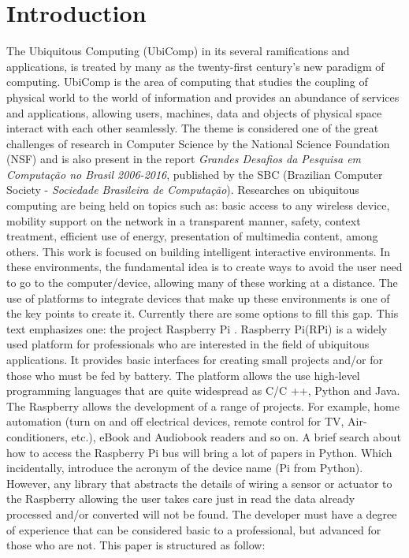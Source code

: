 \documentclass{acm_proc_article-sp}
\begin{document}
\section*{Introduction}
\label{sec:Introduction}
The Ubiquitous Computing (UbiComp) in its several ramifications and applications, is treated by many as the twenty-first century's new paradigm of computing. UbiComp is the area of computing that studies the coupling of physical world to the world of information and provides an abundance of services and applications, allowing users, machines, data and objects of physical space interact with each other seamlessly. The theme is considered one of the great challenges of research in Computer Science by the National Science Foundation (NSF)\cite{NSF} and is also present in the report \textit{Grandes Desafios da Pesquisa em Computação no Brasil 2006-2016}\cite{carvalho2006grandes}, published by the SBC (Brazilian Computer Society - \textit{Sociedade Brasileira de Computa{\c{c}}{\~a}o}).
\newline
\newline
Researches on ubiquitous computing are being held on topics such as: basic access to any wireless device, mobility support on the network in a transparent manner, safety, context treatment, efficient use of energy, presentation of multimedia content, among others. This work is focused on building intelligent interactive environments. In these environments, the fundamental idea is to create ways to avoid the user need to go to the computer/device, allowing many of these working at a distance. The use of platforms to integrate devices that make up these environments is one of the key points to create it. Currently there are some options to fill this gap. This text emphasizes one: the project Raspberry Pi \cite{Trapp,wirth2014making}.
\newline
\newline
Raspberry Pi(RPi) is a widely used platform for professionals who are interested in the field of ubiquitous applications. It provides basic interfaces for creating small projects and/or for those who must be fed by battery. The platform allows the use high-level programming languages that are quite widespread as C/C ++, Python and Java. The Raspberry allows the development of a range of projects. For example, home automation (turn on and off electrical devices, remote control for TV, Air-conditioners, etc.), eBook and Audiobook readers and so on.
\newline
\newline
A brief search about how to access the Raspberry Pi bus will bring  a lot of papers in Python. Which incidentally, introduce the acronym of the device name (Pi from Python). However, any library that abstracts the details of wiring a sensor or actuator to the Raspberry allowing the user takes care just in read the data already processed and/or converted will not be found.
\newline
\newline
The developer must have a degree of experience that can be considered basic to a professional, but advanced for those who are not.
\newline
\newline 
This paper is structured as follow:
\end{document}
